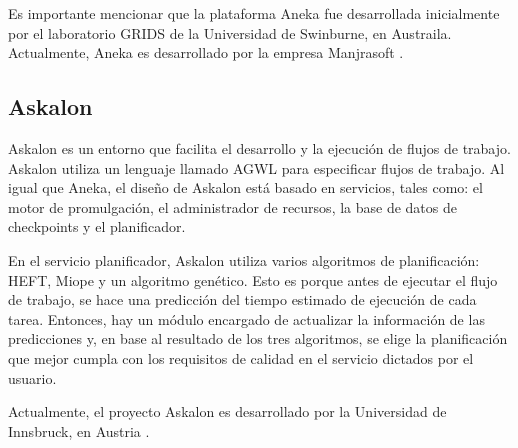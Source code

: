 Es importante mencionar que la plataforma Aneka fue desarrollada inicialmente por el laboratorio GRIDS de la Universidad de Swinburne, en Austraila. Actualmente, Aneka es desarrollado por la empresa Manjrasoft \cite{aneka2014webpage}.

\subsection{Askalon}

Askalon \cite{fahringer2005askalon} es un entorno que facilita el desarrollo y la ejecución de flujos de trabajo. Askalon utiliza un lenguaje llamado AGWL para especificar flujos de trabajo. Al igual que Aneka, el diseño de Askalon está basado en servicios, tales como: el motor de promulgación, el administrador de recursos, la base de datos de checkpoints y el planificador.

En el servicio planificador, Askalon utiliza varios algoritmos de planificación: HEFT, Miope y un algoritmo genético. Esto es porque antes de ejecutar el flujo de trabajo, se hace una predicción del tiempo estimado de ejecución de cada tarea. Entonces, hay un módulo encargado de actualizar la información de las predicciones y, en base al resultado de los tres algoritmos, se elige la planificación que mejor cumpla con los requisitos de calidad en el servicio dictados por el usuario.

Actualmente, el proyecto Askalon es desarrollado por la Universidad de Innsbruck, en Austria \cite{askalon2014webpage}.